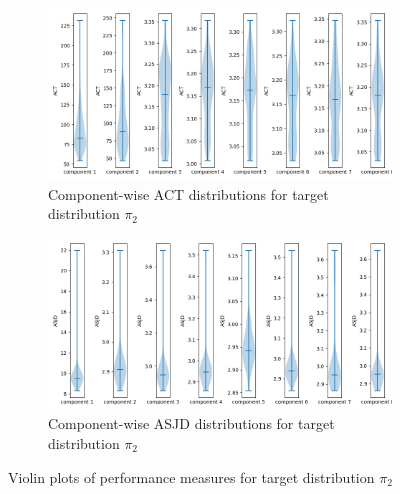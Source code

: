 \documentclass{scrartcl}
\begin{document}
    \begin{figure}
        \centering
        \begin{subfigure}{0.42\textheight}
              \centering
              \includegraphics[width=.8\linewidth]{../figs/ACT_pi_2.png}
              \caption{Component-wise ACT distributions for target distribution $\pi_2$}
              \label{violin_plots_pi_2_act}
        \end{subfigure}
        \begin{subfigure}{0.42\textheight}
              \centering
              \includegraphics[width=.8\linewidth]{../figs/ASJD_pi_2.png}
              \caption{Component-wise ASJD distributions for target distribution $\pi_2$}
              \label{violin_plots_pi_2_asjd}
        \end{subfigure}
        \caption{Violin plots of performance measures for target distribution $\pi_2$}
        \label{violin_plots_pi_2}
    \end{figure}
\end{document}
